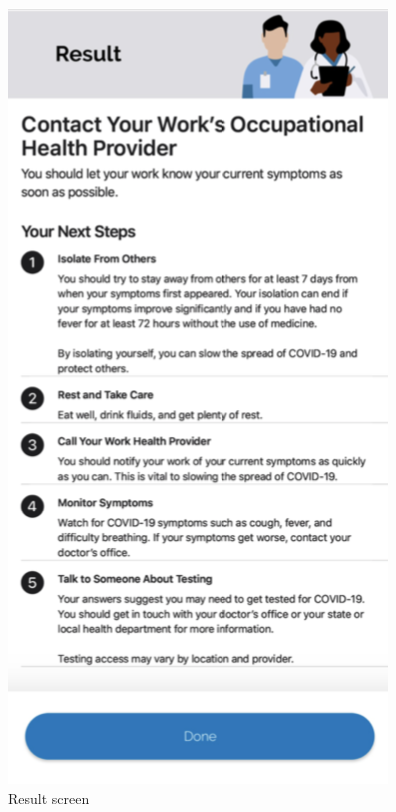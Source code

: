 \begin{center}
\includegraphics[scale=0.55]{result.png}\\[0.75cm]
\caption{Result screen}
\end{center}

